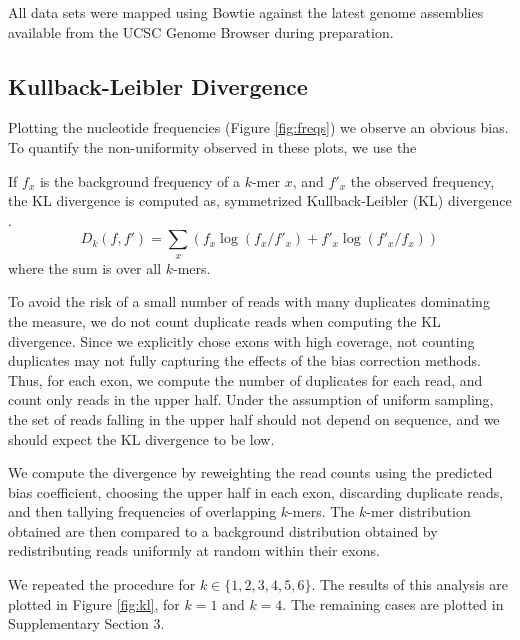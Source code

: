 \documentclass{bioinfo}
\begin{document}
All data sets were mapped using Bowtie \citep{Langmead2009} against the latest
genome assemblies available from the UCSC Genome Browser \citep{Karolchik2008}
during preparation.



\subsection{Kullback-Leibler Divergence}

Plotting the nucleotide frequencies (Figure  \ref{fig:freqs}) we observe an
obvious bias. To quantify the non-uniformity observed in these plots, we use the

If $f_x$ is the background frequency of a $k$-mer $x$, and $f'_x$ the observed
frequency, the KL divergence is computed as, symmetrized Kullback-Leibler (KL)
divergence \citep{Kullback1951}.
$$D_k( f, f' ) = \sum_{x} \left( f_x \log( f_x / f'_x ) + f'_x \log( f'_x / f_x) \right)$$
where the sum is over all $k$-mers.



To avoid the risk of a small number of reads with many duplicates dominating the
measure, we do not count duplicate reads when computing the KL divergence. Since we
explicitly chose exons with high coverage, not counting duplicates may not
fully capturing the effects of the bias correction methods. Thus, for each exon,
we compute the number of duplicates for each read, and count only reads in the
upper half. Under the assumption of uniform sampling, the set of reads falling
in the upper half should not depend on sequence, and we should expect the KL
divergence to be low.

We compute the divergence by reweighting the read counts using the predicted
bias coefficient, choosing the upper half in each exon, discarding duplicate
reads, and then tallying frequencies of overlapping $k$-mers. The $k$-mer
distribution obtained are then compared to a background distribution obtained by
redistributing reads uniformly at random within their exons.

We repeated the procedure for $k \in \{1, 2, 3, 4, 5, 6\}$. The results of this
analysis are plotted in Figure \ref{fig:kl}, for $k = 1$ and $k = 4$. The
remaining cases are plotted in Supplementary Section 3.
\end{document}
